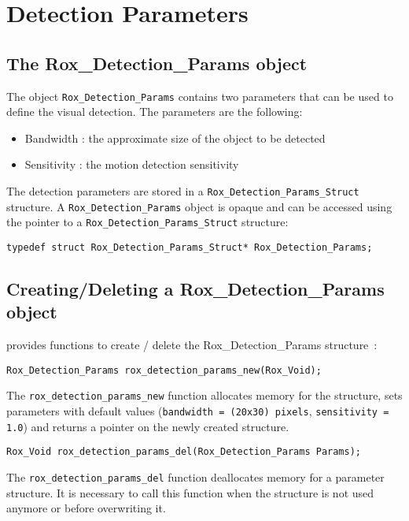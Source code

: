 \section{Detection Parameters}
\label{sec:detection_params}

\subsection{The Rox\_Detection\_Params object}
\label{sse:detection_params_object}

The object \lstinline$Rox_Detection_Params$ contains two
parameters that can be used to define the visual detection.
 The parameters are the following:

\begin{itemize}
\item Bandwidth : the approximate size of the object to be detected 
\item Sensitivity : the motion detection sensitivity
\end{itemize}

The detection parameters are stored in a \lstinline$Rox_Detection_Params_Struct$ structure. A \lstinline$Rox_Detection_Params$ object is opaque and can be accessed using the pointer to a \lstinline$Rox_Detection_Params_Struct$ structure: 
\begin{lstlisting}
typedef struct Rox_Detection_Params_Struct* Rox_Detection_Params;
\end{lstlisting}

\subsection{Creating/Deleting a Rox\_Detection\_Params object}
\label{sse:detection_params_creating}

\rox{} provides functions to create / delete the Rox\_Detection\_Params structure~:

\begin{lstlisting}
Rox_Detection_Params rox_detection_params_new(Rox_Void);
\end{lstlisting}
The \lstinline$rox_detection_params_new$ function allocates memory for the structure, 
sets parameters with default values (\lstinline$bandwidth = (20x30) pixels$, \lstinline$sensitivity = 1.0$) and returns a pointer on the newly created structure.\\

\begin{lstlisting}
Rox_Void rox_detection_params_del(Rox_Detection_Params Params);
\end{lstlisting}
The \lstinline$rox_detection_params_del$ function deallocates memory for a parameter structure. It
is necessary to call this function when the structure is not used anymore or before overwriting it.

